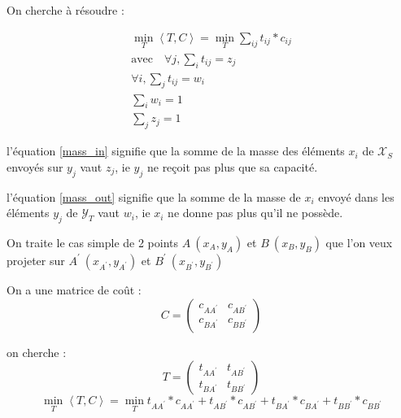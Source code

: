 On cherche à résoudre :

\begin{align}
\min_T \left<T,C\right> = \min_{T} \sum_{ij} t_{ij}*c_{ij}\\
\text{avec}\quad
\forall j, \sum_i t_{ij} = z_j 
\label{mass_in}\\
\forall i, \sum_j t_{ij} = w_i
\label{mass_out}\\
\sum_i w_i = 1
\label{mass_in_tot}\\
\sum_j z_j = 1  
\label{mass_out_tot}
\end{align}

l'équation \eqref{mass_in} signifie que la somme de la masse des éléments $x_i$ de $\mathcal{X}_S$
envoyés sur $y_j$ vaut $z_j$, ie $y_j$ ne reçoit pas plus que sa capacité.

l'équation \eqref{mass_out} signifie que la somme de la masse de $x_i$ envoyé dans les 
éléments $y_j$ de $\mathcal{Y}_T$ vaut $w_i$, ie $x_i$ ne donne pas plus qu'il ne possède.




On traite le cas simple de 2 points $A\ (x_A, y_A)$ et $B\ (x_B, y_B)$ 
que l'on veux projeter sur $A^\prime\ (x_{A^\prime}, y_{A^\prime})$ et $B^\prime\ (x_{B^\prime}, y_{B^\prime})$ 

On a une matrice de coût :
$$
C = 
\begin{pmatrix}
   c_{AA^\prime} & c_{AB^\prime} \\
   c_{BA^\prime} & c_{BB^\prime} 
\end{pmatrix}
$$

on cherche : 
$$
T = 
\begin{pmatrix}
   t_{AA^\prime} & t_{AB^\prime} \\
   t_{BA^\prime} & t_{BB^\prime} 
\end{pmatrix}
$$
\begin{equation}
\min_T \left<T,C\right> = \min_{T} 
t_{AA^\prime}*c_{AA^\prime} + 
t_{AB^\prime}*c_{AB^\prime} + 
t_{BA^\prime}*c_{BA^\prime} + 
t_{BB^\prime}*c_{BB^\prime}
\end{equation}

